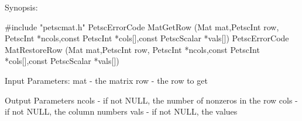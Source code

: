 Synopsis:

#include "petscmat.h"
PetscErrorCode MatGetRow
   (Mat mat,PetscInt row,
    PetscInt *ncols,const PetscInt *cols[],const PetscScalar *vals[])
PetscErrorCode MatRestoreRow
   (Mat mat,PetscInt row,
    PetscInt *ncols,const PetscInt *cols[],const PetscScalar *vals[])

Input Parameters:
mat - the matrix
row - the row to get

Output Parameters
ncols - if not NULL, the number of nonzeros in the row
cols - if not NULL, the column numbers
vals - if not NULL, the values
